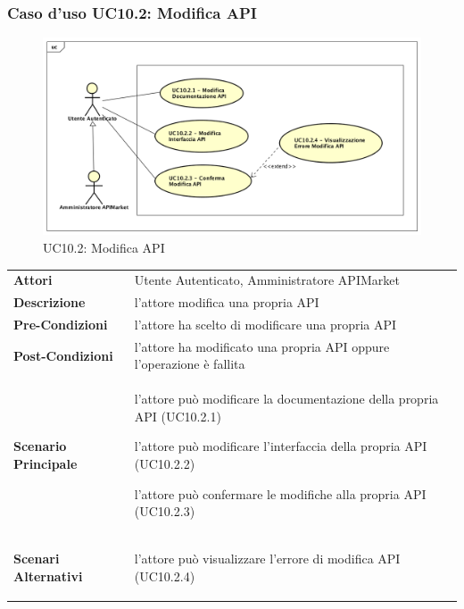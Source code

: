 \subsubsection{Caso d'uso UC10.2: Modifica API}
\label{UC10.2}

\begin{figure}[ht]
	\centering
	\includegraphics[scale=0.45]{UML/UC10_2.png}
	\caption{UC10.2: Modifica API}
\end{figure}

\renewcommand*{\arraystretch}{1.6}
\begin{longtable}{ l | p{11cm}}
	\hline
	\rowcolor{Gray}
	\multicolumn{2}{c}{UC10.2: Modifica API} \\
	\hline
	\textbf{Attori} &Utente Autenticato, Amministratore APIMarket \\
	\textbf{Descrizione} & l'attore modifica una propria API\\
	\textbf{Pre-Condizioni} & l'attore ha scelto di modificare una propria API\\
	\textbf{Post-Condizioni}&l'attore ha modificato una propria API oppure l'operazione è fallita\\
	\textbf{Scenario Principale} & \begin{enumerate*}[label=(\arabic*.),itemjoin={\newline}]
		\item l'attore può modificare la documentazione della propria API (UC10.2.1)
		\item l'attore può modificare l'interfaccia della propria API (UC10.2.2)
		\item l'attore può confermare le modifiche alla propria API (UC10.2.3)
	\end{enumerate*}\\
	\textbf{Scenari Alternativi} & \begin{enumerate*}[label=(\arabic*.),itemjoin={\newline}]
		\item l'attore può visualizzare l'errore di modifica API (UC10.2.4)
	\end{enumerate*}\\
\end{longtable}
